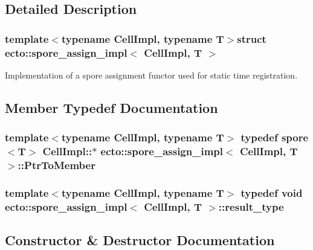 \subsection{Detailed Description}
\subsubsection*{template$<$typename Cell\+Impl, typename T$>$struct ecto\+::spore\+\_\+assign\+\_\+impl$<$ Cell\+Impl, T $>$}

Implementation of a spore assignment functor used for static time registration. 

\subsection{Member Typedef Documentation}
\hypertarget{structecto_1_1spore__assign__impl_a374a7ffdead1191878d49a6ef295ada6}{}
\subsubsection[{Ptr\+To\+Member}]{\setlength{\rightskip}{0pt plus 5cm}template$<$typename Cell\+Impl, typename T$>$ typedef {\bf spore}$<$T$>$ Cell\+Impl\+::$\ast$ {\bf ecto\+::spore\+\_\+assign\+\_\+impl}$<$ Cell\+Impl, T $>$\+::{\bf Ptr\+To\+Member}}\label{structecto_1_1spore__assign__impl_a374a7ffdead1191878d49a6ef295ada6}
\hypertarget{structecto_1_1spore__assign__impl_a4947968d387bce16aab17acdfd094019}{}
\subsubsection[{result\+\_\+type}]{\setlength{\rightskip}{0pt plus 5cm}template$<$typename Cell\+Impl, typename T$>$ typedef void {\bf ecto\+::spore\+\_\+assign\+\_\+impl}$<$ Cell\+Impl, T $>$\+::{\bf result\+\_\+type}}\label{structecto_1_1spore__assign__impl_a4947968d387bce16aab17acdfd094019}


\subsection{Constructor \& Destructor Documentation}
\hypertarget{structecto_1_1spore__assign__impl_a13bb14dea6f8005bad7376803d2ec5ea}{}
